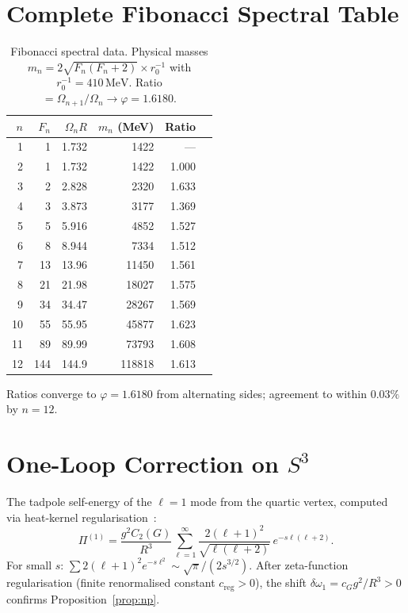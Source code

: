 \documentclass[
  aps,
  prd,
  reprint,
  superscriptaddress,
  nofootinbib,
  longbibliography,
  amsmath,
  amssymb
]{revtex4-2}
\theoremstyle{plain}
\theoremstyle{definition}
\theoremstyle{remark}
\newcommand{\vp}{\varphi}
\begin{document}
\section{Complete Fibonacci Spectral Table}
\label{app:spectrum}

\begin{table}[h]
\centering
\caption{Fibonacci spectral data.
  Physical masses $m_n=2\sqrt{F_n(F_n+2)}\times r_0^{-1}$
  with $r_0^{-1}=410\,\mathrm{MeV}$.
  Ratio $=\Omega_{n+1}/\Omega_n\to\vp=1.6180$.}
\label{tab:spectrum}
\begin{tabular}{rrrrrr}
\toprule
$n$ & $F_n$ & $\Omega_n R$ & $m_n$ (MeV) & Ratio \\
\midrule
1  & 1   & 1.732 &  1422 & ---   \\
2  & 1   & 1.732 &  1422 & 1.000 \\
3  & 2   & 2.828 &  2320 & 1.633 \\
4  & 3   & 3.873 &  3177 & 1.369 \\
5  & 5   & 5.916 &  4852 & 1.527 \\
6  & 8   & 8.944 &  7334 & 1.512 \\
7  & 13  & 13.96 & 11450 & 1.561 \\
8  & 21  & 21.98 & 18027 & 1.575 \\
9  & 34  & 34.47 & 28267 & 1.569 \\
10 & 55  & 55.95 & 45877 & 1.623 \\
11 & 89  & 89.99 & 73793 & 1.608 \\
12 & 144 & 144.9 &118818 & 1.613 \\
\bottomrule
\end{tabular}

\smallskip
Ratios converge to $\vp=1.6180$ from alternating sides;
agreement to within $0.03\%$ by $n=12$.
\end{table}

\section{\texorpdfstring{One-Loop Correction on $S^3$}{One-Loop Correction on S3}}
\label{app:oneloop}

The tadpole self-energy of the $\ell=1$ mode from the quartic vertex,
computed via heat-kernel regularisation~\cite{Dowker1976}:
\begin{equation}
  \Pi^{(1)} = \frac{g^2 C_2(G)}{R^3}\sum_{\ell=1}^\infty
    \frac{2(\ell+1)^2}{\sqrt{\ell(\ell+2)}}\,e^{-s\ell(\ell+2)}.
\end{equation}
For small $s$: $\sum2(\ell+1)^2 e^{-s\ell^2}\sim\sqrt\pi/(2s^{3/2})$.
After zeta-function regularisation (finite renormalised constant
$c_{\mathrm{reg}}>0$), the shift $\delta\omega_1 = c_G g^2/R^3>0$
confirms Proposition~\ref{prop:np}.
\end{document}
